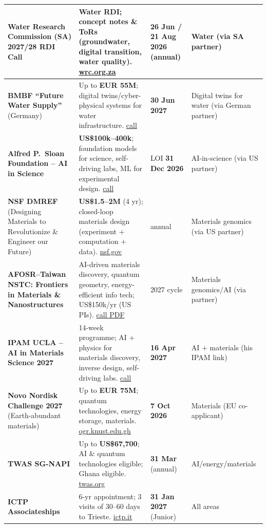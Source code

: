 \documentclass[11pt,a4paper]{article}
\begin{document}
\begin{longtable}{@{}p{3.3cm}p{5.6cm}p{2.2cm}p{2.8cm}@{}}
\midrule
\textbf{Water Research Commission (SA) 2027/28 RDI Call} & Water RDI; concept notes \& ToRs (groundwater, digital transition, water quality). \href{https://www.wrc.org.za/opportunities/}{wrc.org.za} & 26 Jun / 21 Aug 2026 (annual) & Water (via SA partner) \\
\midrule
\textbf{BMBF ``Future Water Supply''} (Germany) & Up to \textbf{EUR 55M}; digital twins/cyber-physical systems for water infrastructure. \href{https://www.grantbite.com/en/funding/bmbf-future-water-supply-research-funding}{call} & \textbf{30 Jun 2027} & Digital twins for water (via German partner) \\
\midrule
\textbf{Alfred P.\ Sloan Foundation -- AI in Science} & \textbf{US\$100k--400k}; foundation models for science, self-driving labs, ML for experimental design. \href{https://grantedai.com/grants/sloan-foundation-exploratory-grantmaking-technology-ai-science-foundation-models-lab-automation-sloan-a8c1d4e7}{call} & LOI \textbf{31 Dec 2026} & AI-in-science (via US partner) \\
\midrule
\textbf{NSF DMREF} (Designing Materials to Revolutionize \& Engineer our Future) & \textbf{US\$1.5--2M} (4 yr); closed-loop materials design (experiment $+$ computation $+$ data). \href{https://www.nsf.gov/funding/opportunities/dmref-designing-materials-revolutionize-engineer-our-future}{nsf.gov} & annual & Materials genomics (via US partner) \\
\midrule
\textbf{AFOSR--Taiwan NSTC: Frontiers in Materials \& Nanostructures} & AI-driven materials discovery, quantum geometry, energy-efficient info tech; US\$150k/yr (US PIs). \href{https://ord.ntcu.edu.tw/storage/media/24zz853RTpNndvOfI8OZAvRPgQ1k6EcE2kNbVxJ9.pdf}{call PDF} & 2027 cycle & Materials genomics/AI (via partner) \\
\midrule
\textbf{IPAM UCLA -- AI in Materials Science 2027} & 14-week programme; AI $+$ physics for materials discovery, inverse design, self-driving labs. \href{https://atomgrants.com/grant/artificial-intelligence-materials-science-institute-for-pure-and-applied-mathematics}{call} & \textbf{16 Apr 2027} & AI $+$ materials (his IPAM link) \\
\midrule
\textbf{Novo Nordisk Challenge 2027} (Earth-abundant materials) & Up to \textbf{EUR 75M}; quantum technologies, energy storage, materials. \href{https://ogr.knust.edu.gh/funding/novo-nordisk-foundation-challenge-programme-2027-harnessing-novel-earth-abundant-materials}{ogr.knust.edu.gh} & \textbf{7 Oct 2026} & Materials (EU co-applicant) \\
\midrule
\textbf{TWAS SG-NAPI} & Up to \textbf{US\$67{,}700}; AI \& quantum technologies eligible; Ghana eligible. \href{https://twas.org/opportunity/seed-grant-new-african-principal-investigators-sg-napi}{twas.org} & \textbf{31 Mar} (annual) & AI/energy/materials \\
\midrule
\textbf{ICTP Associateships} & 6-yr appointment; 3 visits of 30--60 days to Trieste. \href{https://www.ictp.it/home/associates-programme}{ictp.it} & \textbf{31 Jan 2027} (Junior) & All areas \\
\bottomrule
\end{longtable}
\end{document}
